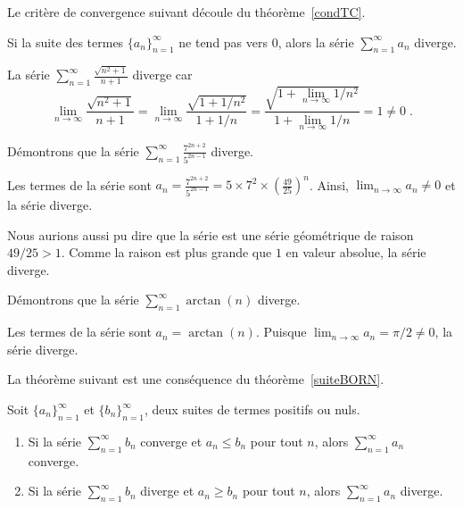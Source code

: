 {Le critère de convergence suivant découle du théorème~\ref{condTC}.

\begin{focus}{\thm}
Si la suite des termes $\displaystyle \{a_n\}_{n=1}^\infty$ ne tend
pas vers $0$, alors la série $\displaystyle \sum_{n=1}^\infty a_n$
diverge.
\label{NCforCofS}
\end{focus}

\begin{egg}
La série $\displaystyle \sum_{n=1}^\infty \frac{\sqrt{n^2+1}}{n+1}$
diverge car
\[
\lim_{n\rightarrow \infty} \frac{\sqrt{n^2+1}}{n+1}
= \lim_{n\rightarrow \infty} \frac{\sqrt{1+1/n^2}}{1+1/n}
= \frac{\sqrt{\displaystyle 1+ \lim_{n\rightarrow \infty}1/n^2}}
{\displaystyle 1+ \lim_{n\rightarrow \infty}1/n} = 1 \neq 0 \; .
\]
\end{egg}

\begin{egg}
Démontrons que la série
$\displaystyle \sum_{n=1}^\infty \frac{7^{2n+2}}{5^{2n-1}}$
diverge.

Les termes de la série sont
$\displaystyle a_n = \frac{7^{2n+2}}{5^{2n-1}} = 5\times 7^2 \times
\left(\frac{49}{25}\right)^n$.   Ainsi,
$\lim_{n\rightarrow \infty} a_n \neq 0$ et la série diverge.

Nous aurions aussi pu dire que la série est une série géométrique de
raison $49/25 > 1$.  Comme la raison est plus grande que $1$ en valeur
absolue, la série diverge.
\end{egg}

\begin{egg}
Démontrons que la série
$\displaystyle \sum_{n=1}^\infty \arctan(n)$ diverge.

Les termes de la série sont $\displaystyle a_n = \arctan(n)$.
Puisque $\lim_{n\rightarrow \infty} a_n = \pi/2 \neq 0$, la série diverge.
\end{egg}

La théorème suivant est une conséquence du théorème~\ref{suiteBORN}.

\begin{focus}{\thm} \label{comp_theo}
Soit $\displaystyle \{a_n\}_{n=1}^\infty$ et
$\displaystyle \{b_n\}_{n=1}^\infty$, deux suites de termes positifs
ou nuls.
\begin{enumerate}
\item Si la série $\displaystyle \sum_{n=1}^\infty b_n$ converge et
$a_n\leq b_n$ pour tout $n$, alors $\displaystyle \sum_{n=1}^\infty a_n$
converge.
\item Si la série $\displaystyle \sum_{n=1}^\infty b_n$ diverge et
$a_n\geq b_n$ pour tout $n$, alors $\displaystyle \sum_{n=1}^\infty a_n$
diverge.
\end{enumerate}
\end{focus}

}
